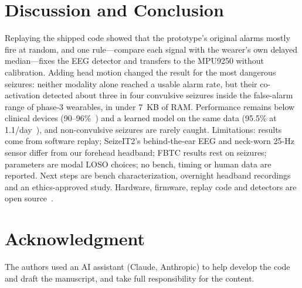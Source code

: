 \documentclass[conference,letterpaper]{IEEEtran}
\begin{document}
\section{Discussion and Conclusion}
Replaying the shipped code showed that the prototype's original alarms mostly fire at random, and one rule---compare each signal with the wearer's own delayed median---fixes the EEG detector and transfers to the MPU9250 without calibration. Adding head motion changed the result for the most dangerous seizures: neither modality alone reached a usable alarm rate, but their co-activation detected about three in four convulsive seizures inside the false-alarm range of phase-3 wearables, in under 7~KB of RAM. Performance remains below clinical devices (90--96\%~\cite{beniczky2021guideline}) and a learned model on the same data (95.5\% at 1.1/day~\cite{zhang2024multimodal}), and non-convulsive seizures are rarely caught. Limitations: results come from software replay; SeizeIT2's behind-the-ear EEG and neck-worn 25-Hz sensor differ from our forehead headband; FBTC results rest on \SCvAN{} seizures; parameters are modal LOSO choices; no bench, timing or human data are reported. Next steps are bench characterization, overnight headband recordings and an ethics-approved study. Hardware, firmware, replay code and detectors are open source~\cite{vera_repo}.

\section*{Acknowledgment}
The authors used an AI assistant (Claude, Anthropic) to help develop the code and draft the manuscript, and take full responsibility for the content.



\end{document}
